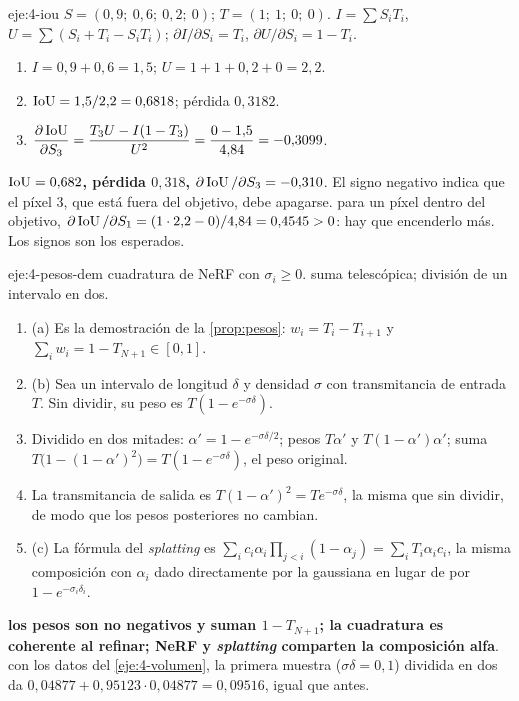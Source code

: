 \begin{solucion}{eje:4-iou}
\datos $S=(0{,}9;\ 0{,}6;\ 0{,}2;\ 0)$; $T=(1;\ 1;\ 0;\ 0)$.
\planteamiento $I=\sum S_iT_i$, $U=\sum(S_i+T_i-S_iT_i)$; $\partial I/\partial S_i=T_i$, $\partial U/\partial S_i=1-T_i$.
\pasos
\begin{enumerate}[label=\arabic*.]
  \item $I=0{,}9+0{,}6=1{,}5$; $U=1+1+0{,}2+0=2{,}2$.
  \item $\operatorname{IoU}=1{,}5/2{,}2=0{,}6818$; pérdida $0{,}3182$.
  \item $\dfrac{\partial\operatorname{IoU}}{\partial S_3}=\dfrac{T_3U-I(1-T_3)}{U^2}=\dfrac{0-1{,}5}{4{,}84}=-0{,}3099$.
\end{enumerate}
\resultado \textbf{$\operatorname{IoU}=0{,}682$, pérdida $0{,}318$, $\partial\operatorname{IoU}/\partial S_3=-0{,}310$}. El signo negativo indica que el píxel 3, que está fuera del objetivo, debe apagarse.
\comprobacion para un píxel dentro del objetivo, $\partial\operatorname{IoU}/\partial S_1=(1\cdot 2{,}2-0)/4{,}84=0{,}4545>0$: hay que encenderlo más. Los signos son los esperados.
\end{solucion}

\begin{solucion}{eje:4-pesos-dem}
\datos cuadratura de NeRF con $\sigma_i\ge 0$.
\planteamiento suma telescópica; división de un intervalo en dos.
\pasos
\begin{enumerate}[label=\arabic*.]
  \item (a) Es la demostración de la \cref{prop:pesos}: $w_i=T_i-T_{i+1}$ y $\sum_i w_i=1-T_{N+1}\in[0,1]$.
  \item (b) Sea un intervalo de longitud $\delta$ y densidad $\sigma$ con transmitancia de entrada $T$. Sin dividir, su peso es $T(1-e^{-\sigma\delta})$.
  \item Dividido en dos mitades: $\alpha'=1-e^{-\sigma\delta/2}$; pesos $T\alpha'$ y $T(1-\alpha')\alpha'$; suma $T\bigl(1-(1-\alpha')^2\bigr)=T(1-e^{-\sigma\delta})$, el peso original.
  \item La transmitancia de salida es $T(1-\alpha')^2=Te^{-\sigma\delta}$, la misma que sin dividir, de modo que los pesos posteriores no cambian.
  \item (c) La fórmula del \emph{splatting} es $\sum_ic_i\alpha_i\prod_{j<i}(1-\alpha_j)=\sum_iT_i\alpha_ic_i$, la misma composición con $\alpha_i$ dado directamente por la gaussiana en lugar de por $1-e^{-\sigma_i\delta_i}$.
\end{enumerate}
\resultado \textbf{los pesos son no negativos y suman $1-T_{N+1}$; la cuadratura es coherente al refinar; NeRF y \emph{splatting} comparten la composición alfa}.
\comprobacion con los datos del \cref{eje:4-volumen}, la primera muestra ($\sigma\delta=0{,}1$) dividida en dos da $0{,}04877+0{,}95123\cdot 0{,}04877=0{,}09516$, igual que antes.
\end{solucion}

